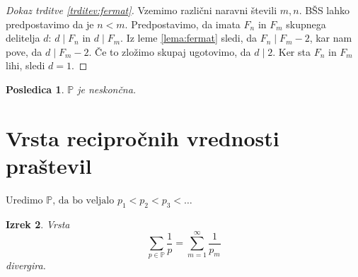 \documentclass{amsart}
\newcommand{\PP}{\mathbb{P}}
\newtheorem{izrek}{Izrek}[section]
\newtheorem{posledica}[izrek]{Posledica}
\begin{document}
\begin{proof}[Dokaz trditve \ref{trditev:fermat}]
    Vzemimo različni naravni števili \(m,n\). BŠS lahko predpostavimo da je \(n<m\). Predpostavimo, da imata 
    \(F_n\) in \(F_m\) skupnega delitelja \(d\): \(d \mid F_n\) in \(d \mid F_m\). Iz leme \ref{lema:fermat} sledi, 
    da \(F_n \mid {F_m - 2}\), kar nam pove, da \(d \mid F_m-2\). Če to zložimo skupaj ugotovimo, da \(d \mid 2\). 
    Ker sta \(F_n\) in \(F_m\) lihi, sledi \(d = 1\).
\end{proof}

\begin{posledica}
    \(\PP\) je neskončna.
\end{posledica}

\newpage
\section{Vrsta recipročnih vrednosti praštevil}
Uredimo \(\PP \text{, da bo veljalo } p_1 < p_2< p_3<\ldots\)
\begin{izrek}
    Vrsta \[\sum_{p \in \PP} \frac{1}{p} = \sum_{m = 1}^{\infty} \frac{1}{p_m}\] divergira.
\end{izrek}
\end{document}
